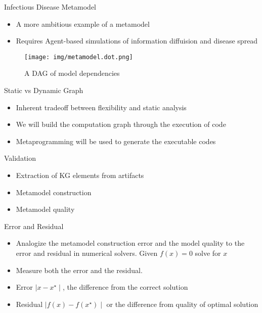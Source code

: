 \documentclass[ignorenonframetext,]{beamer}
\providecommand{\tightlist}{%
  \setlength{\itemsep}{0pt}\setlength{\parskip}{0pt}}
\begin{document}
\begin{frame}{Infectious Disease Metamodel}
\protect\hypertarget{infectious-disease-metamodel}{}

\begin{itemize}
\tightlist
\item
  A more ambitious example of a metamodel
\item
  Requires Agent-based simulations of information diffuision and disease
  spread
\end{itemize}
\begin{figure}
\centering
\texttt{[image: img/metamodel.dot.png]}
\caption{A DAG of model dependencies}
\end{figure}

\end{frame}

\begin{frame}{Static vs Dynamic Graph}
\protect\hypertarget{static-vs-dynamic-graph}{}

\begin{itemize}
\tightlist
\item
  Inherent tradeoff between flexibility and static analysis
\item
  We will build the computation graph through the execution of code
\item
  Metaprogramming will be used to generate the executable codes
\end{itemize}

\end{frame}

\begin{frame}{Validation}
\protect\hypertarget{validation}{}

\begin{itemize}
\tightlist
\item
  Extraction of KG elements from artifacts
\item
  Metamodel construction
\item
  Metamodel quality
\end{itemize}

\begin{block}{Error and Residual}

\begin{itemize}
\item
  Analogize the metamodel construction error and the model quality to
  the error and residual in numerical solvers. Given \(f(x)=0\) solve
  for \(x\)
\item
  Measure both the error and the residual.
\item
  Error \(\mid x-x^\star\mid\), the difference from the correct solution
\item
  Residual \(\mid f(x) - f(x^\star)\mid\) or the difference from quality
  of optimal solution
\end{itemize}

\end{block}

\end{frame}
\end{document}
